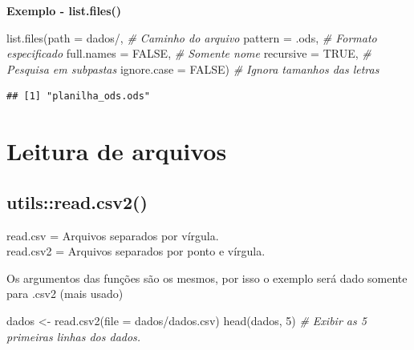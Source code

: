\documentclass[
]{book}
\newenvironment{Shaded}{\begin{snugshade}}{\end{snugshade}}
\newcommand{\AttributeTok}[1]{\textcolor[rgb]{0.77,0.63,0.00}{#1}}
\newcommand{\CommentTok}[1]{\textcolor[rgb]{0.56,0.35,0.01}{\textit{#1}}}
\newcommand{\ConstantTok}[1]{\textcolor[rgb]{0.00,0.00,0.00}{#1}}
\newcommand{\DecValTok}[1]{\textcolor[rgb]{0.00,0.00,0.81}{#1}}
\newcommand{\FunctionTok}[1]{\textcolor[rgb]{0.00,0.00,0.00}{#1}}
\newcommand{\NormalTok}[1]{#1}
\newcommand{\OtherTok}[1]{\textcolor[rgb]{0.56,0.35,0.01}{#1}}
\newcommand{\StringTok}[1]{\textcolor[rgb]{0.31,0.60,0.02}{#1}}
\theoremstyle{definition}
\theoremstyle{definition}
\theoremstyle{definition}
\theoremstyle{definition}
\theoremstyle{remark}
\begin{document}
\textbf{Exemplo - list.files()}

\begin{Shaded}
\begin{Highlighting}[]
\FunctionTok{list.files}\NormalTok{(}\AttributeTok{path =} \StringTok{\textquotesingle{}dados/\textquotesingle{}}\NormalTok{,      }\CommentTok{\# Caminho do arquivo}
           \AttributeTok{pattern =} \StringTok{\textquotesingle{}.ods\textquotesingle{}}\NormalTok{,     }\CommentTok{\# Formato especificado}
           \AttributeTok{full.names =} \ConstantTok{FALSE}\NormalTok{,   }\CommentTok{\# Somente nome}
           \AttributeTok{recursive =} \ConstantTok{TRUE}\NormalTok{,     }\CommentTok{\# Pesquisa em subpastas}
           \AttributeTok{ignore.case =} \ConstantTok{FALSE}\NormalTok{)  }\CommentTok{\# Ignora tamanhos das letras}
\end{Highlighting}
\end{Shaded}

\begin{verbatim}
## [1] "planilha_ods.ods"
\end{verbatim}

\hypertarget{leitura-de-arquivos}{%
\section{Leitura de arquivos}\label{leitura-de-arquivos}}

\hypertarget{utilsread.csv2}{%
\subsection{utils::read.csv2()}\label{utilsread.csv2}}

read.csv = Arquivos separados por vírgula.\\
read.csv2 = Arquivos separados por ponto e vírgula.

Os argumentos das funções são os mesmos, por isso o exemplo será dado somente para .csv2 (mais usado)

\begin{Shaded}
\begin{Highlighting}[]
\NormalTok{dados }\OtherTok{\textless{}{-}} \FunctionTok{read.csv2}\NormalTok{(}\AttributeTok{file =} \StringTok{\textquotesingle{}dados/dados.csv\textquotesingle{}}\NormalTok{)}
\FunctionTok{head}\NormalTok{(dados, }\DecValTok{5}\NormalTok{)          }\CommentTok{\# Exibir as 5 primeiras linhas dos dados.}
\end{Highlighting}
\end{Shaded}
\end{document}
